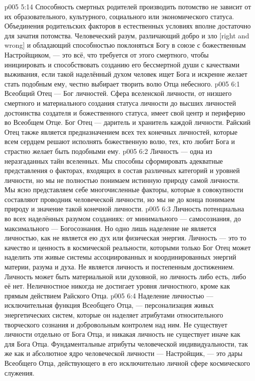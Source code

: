 \vs p005 5:14 Способность смертных родителей производить потомство не зависит от их образовательного, культурного, социального или экономического статуса. Объединения родительских факторов в естественных условиях вполне достаточно для зачатия потомства. Человеческий разум, различающий добро и зло [right and wrong] и обладающий способностью поклоняться Богу в союзе с божественным Настройщиком, --- это всё, что требуется от этого смертного, чтобы инициировать и способствовать созданию его бессмертной души с качествами выживания, если такой наделённый духом человек ищет Бога и искренне желает стать подобным ему, честно выбирает творить волю Отца небесного.
\vs p005 6:1 Всеобщий Отец --- Бог личностей. Сфера вселенской личности, от низшего смертного и материального создания статуса личности до высших личностей достоинства создателя и божественного статуса, имеет свой центр и периферию во Всеобщем Отце. Бог Отец --- даритель и хранитель каждой личности. Райский Отец также является предназначением всех тех конечных личностей, которые всем сердцем решают исполнять божественную волю, тех, кто любит Бога и страстно желает быть подобными ему.
\vs p005 6:2 \pc Личность --- одна из неразгаданных тайн вселенных. Мы способны сформировать адекватные представления о факторах, входящих в состав различных категорий и уровней личности, но мы не полностью понимаем истинную природу самой личности. Мы ясно представляем себе многочисленные факторы, которые в совокупности составляют проводник человеческой личности, но мы не до конца понимаем природу и значение такой конечной личности.
\vs p005 6:3 Личность потенциальна во всех наделённых разумом созданиях: от минимального --- самосознания, до максимального --- Богосознания. Но одно лишь наделение не является личностью, как не является ею дух или физическая энергия. Личность --- это то качество и ценность в космической реальности, которыми только Бог Отец может наделить эти живые системы ассоциированных и координированных энергий материи, разума и духа. Не является личность и постепенным достижением. Личность может быть материальной или духовной, но личность либо есть, либо её нет. Неличностное никогда не достигает уровня личностного, кроме как прямым действием Райского Отца.
\vs p005 6:4 Наделение личностью --- исключительная функция Всеобщего Отца, --- персонализация живых энергетических систем, которые он наделяет атрибутами относительного творческого сознания и добровольным контролем над ним. Не существует личности отдельно от Бога Отца, и никакая личность не существует иначе как для Бога Отца. Фундаментальные атрибуты человеческой индивидуальности, так же как и абсолютное ядро человеческой личности --- Настройщик, --- это дары Всеобщего Отца, действующего в его исключительно личной сфере космического служения.
